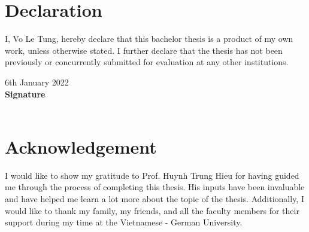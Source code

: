 \documentclass[a4paper,11pt]{report}
\begin{document}
\chapter*{Declaration}
I, Vo Le Tung, hereby declare that this bachelor thesis is a product of my own work, unless otherwise stated.
I further declare that the thesis has not been previously or concurrently submitted for evaluation at any other institutions.

\vspace{1cm}
\noindent 6th January 2022\\
\textbf{Signature}
\vspace{3cm}\\
\underline{\hspace{5cm}}\\

\chapter*{Acknowledgement}
I would like to show my gratitude to Prof. Huynh Trung Hieu for having guided me through the process of completing this thesis.
His inputs have been invaluable and have helped me learn a lot more about the topic of the thesis.
Additionally, I would like to thank my family, my friends, and all the faculty members for their support during my time at the Vietnamese - German University.
\tableofcontents

\listoffigures

\listoftables

\newpage
{}













\printbibliography[title=References]



\printglossaries
\end{document}

